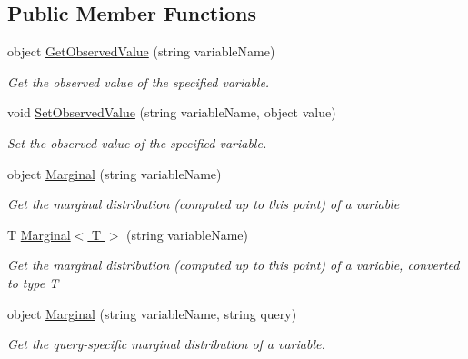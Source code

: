 \subsection*{Public Member Functions}
\begin{DoxyCompactItemize}
\item 
object \hyperlink{class_microsoft_research_1_1_infer_1_1_models_1_1_user_1_1_model___e_p_ad41ad455ee9c75d9eb227088e3908237}{Get\+Observed\+Value} (string variable\+Name)
\begin{DoxyCompactList}\small\item\em Get the observed value of the specified variable.\end{DoxyCompactList}\item 
void \hyperlink{class_microsoft_research_1_1_infer_1_1_models_1_1_user_1_1_model___e_p_a1784d712f959b19cf9b6dd1fad20aa9e}{Set\+Observed\+Value} (string variable\+Name, object value)
\begin{DoxyCompactList}\small\item\em Set the observed value of the specified variable.\end{DoxyCompactList}\item 
object \hyperlink{class_microsoft_research_1_1_infer_1_1_models_1_1_user_1_1_model___e_p_ad7fa30acf60524bfba9c5fa41db1dc32}{Marginal} (string variable\+Name)
\begin{DoxyCompactList}\small\item\em Get the marginal distribution (computed up to this point) of a variable\end{DoxyCompactList}\item 
T \hyperlink{class_microsoft_research_1_1_infer_1_1_models_1_1_user_1_1_model___e_p_a83c754cda6fc44c9d11b4b1f6a67de91}{Marginal$<$ T $>$} (string variable\+Name)
\begin{DoxyCompactList}\small\item\em Get the marginal distribution (computed up to this point) of a variable, converted to type T\end{DoxyCompactList}\item 
object \hyperlink{class_microsoft_research_1_1_infer_1_1_models_1_1_user_1_1_model___e_p_aebb71d022bc194202b191a255d3647fd}{Marginal} (string variable\+Name, string query)
\begin{DoxyCompactList}\small\item\em Get the query-\/specific marginal distribution of a variable.\end{DoxyCompactList}\item 

\end{DoxyCompactItemize}
